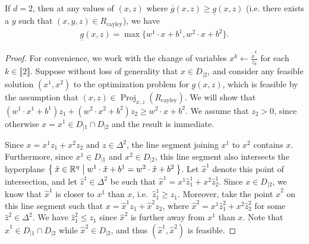 \documentclass[smallextended]{svjour3}
\newcommand{\Proj}{\operatorname{Proj}}
\newcommand{\tx}{\widetilde{x}}
\newcommand{\Rcayley}{R_{\operatorname{cayley}}}
\newcommand{\ubar}[1]{\underline{#1}}
\renewcommand{\bar}[1]{\overline{#1}}
\begin{document}
\begin{lemma}\label{lem:max_2_ideal_lb}
    If $d=2$, then at any values of $(x,z)$ where $\bar{g}(x,z)\ge\ubar{g}(x,z)$ (i.e. there exists a $y$ such that $(x,y,z) \in \Rcayley$), we have
    \begin{align*}
        \ubar{g}(x,z) = \max\{w^1 \cdot x + b^1, w^2 \cdot x + b^2\}.
    \end{align*}
\end{lemma}
\begin{proof}
For convenience, we work with the change of variables $x^k \leftarrow \frac{\tx^k}{z_k}$ for each $k \in \llbracket 2 \rrbracket$. Suppose without loss of generality that $x\in D_{|2}$, and consider any feasible solution $(x^1,x^2)$ to the optimization problem for $\ubar{g}(x,z)$, which is feasible by the assumption that $(x,z) \in \Proj_{x,z}(\Rcayley)$. We will show that $(w^1\cdot x^1+b^1)z_1+(w^2\cdot x^2+b^2)z_2\ge w^2\cdot x+b^2$. We assume that $z_2>0$, since otherwise $x=x^1\in D_{|1}\cap D_{|2}$ and the result is immediate.

Since $x=x^1z_1+x^2z_2$ and $z \in \Delta^2$, the line segment joining $x^1$ to $x^2$ contains $x$. Furthermore, since $x^1\in D_{|1}$ and $x^2\in D_{|2}$, this line segment also intersects the hyperplane $\Set{\hat{x}\in\mathbb{R}^\eta | w^1 \cdot \hat{x}+b^1=w^2 \cdot \hat{x}+b^2}$. Let $\hat{x}^1$ denote this point of intersection, and let $\hat{z}^1\in \Delta^2$ be such that $\hat{x}^1=x^1\hat{z}^1_1+x^2\hat{z}^1_2$. Since $x\in D_{|2}$, we know that $\hat{x}^1$ is closer to $x^1$ than $x$, i.e.\ $\hat{z}^1_1 \ge z_1$. Moreover, take the point $\hat{x}^2$ on this line segment such that $x=\hat{x}^1z_1+\hat{x}^2z_2$,
where $\hat{x}^2=x^1\hat{z}^2_1+x^2\hat{z}^2_2$ for some $\hat{z}^2 \in \Delta^2$. We have $\hat{z}^2_1 \le z_1$ since $\hat{x}^2$ is further away from $x^1$ than $x$.  Note that $\hat{x}^1\in D_{|1}\cap D_{|2}$ while $\hat{x}^2\in D_{|2}$, and thus $(\hat{x}^1, \hat{x}^2)$ is feasible.


\end{proof}
\end{document}
